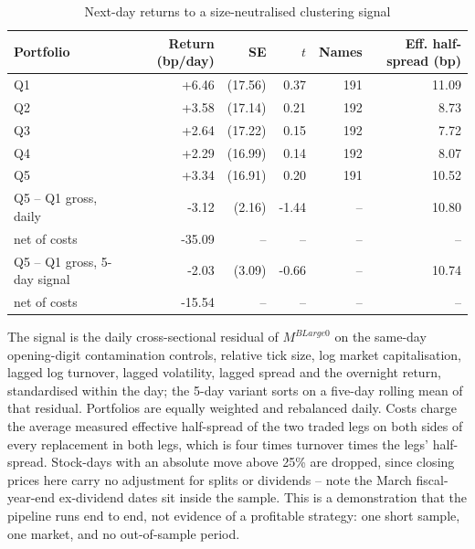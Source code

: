 \begin{table}[htbp]
\centering
\caption{Next-day returns to a size-neutralised clustering signal}
\label{tab:strategy}
\small
\begin{threeparttable}
\begin{tabular}{@{}lrrrrr@{}}
\toprule
Portfolio & Return (bp/day) & SE & $t$ & Names & Eff. half-spread (bp) \\
\midrule
Q1 & +6.46 & (17.56) & 0.37 & 191 & 11.09 \\
Q2 & +3.58 & (17.14) & 0.21 & 192 & 8.73 \\
Q3 & +2.64 & (17.22) & 0.15 & 192 & 7.72 \\
Q4 & +2.29 & (16.99) & 0.14 & 192 & 8.07 \\
Q5 & +3.34 & (16.91) & 0.20 & 191 & 10.52 \\
Q5 -- Q1 gross, daily & -3.12 & (2.16) & -1.44 & -- & 10.80 \\
\quad net of costs & -35.09 & -- & -- & -- & -- \\
Q5 -- Q1 gross, 5-day signal & -2.03 & (3.09) & -0.66 & -- & 10.74 \\
\quad net of costs & -15.54 & -- & -- & -- & -- \\
\bottomrule
\end{tabular}
\begin{tablenotes}[flushleft]\footnotesize
\item The signal is the daily cross-sectional residual of $M^{BLarge0}$ on the same-day opening-digit contamination controls, relative tick size, log market capitalisation, lagged log turnover, lagged volatility, lagged spread and the overnight return, standardised within the day; the 5-day variant sorts on a five-day rolling mean of that residual. Portfolios are equally weighted and rebalanced daily. Costs charge the average measured effective half-spread of the two traded legs on both sides of every replacement in both legs, which is four times turnover times the legs' half-spread. Stock-days with an absolute move above 25\% are dropped, since closing prices here carry no adjustment for splits or dividends -- note the March fiscal-year-end ex-dividend dates sit inside the sample. This is a demonstration that the pipeline runs end to end, not evidence of a profitable strategy: one short sample, one market, and no out-of-sample period.
\end{tablenotes}
\end{threeparttable}
\end{table}
